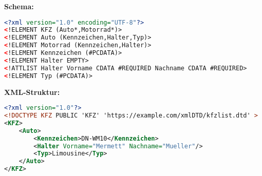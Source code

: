 \textbf{Schema:}
\begin{lstlisting}[language=xml, caption={XML-Datei},
label={lst:xml}]
<?xml version="1.0" encoding="UTF-8"?>
<!ELEMENT KFZ (Auto*,Motorrad*)>
<!ELEMENT Auto (Kennzeichen,Halter,Typ)>
<!ELEMENT Motorrad (Kennzeichen,Halter)>
<!ELEMENT Kennzeichen (#PCDATA)>
<!ELEMENT Halter EMPTY>
<!ATTLIST Halter Vorname CDATA #REQUIRED Nachname CDATA #REQUIRED>
<!ELEMENT Typ (#PCDATA)>
\end{lstlisting}

\textbf{XML-Struktur:}
\begin{lstlisting}[language=xml, caption={XML-Datei},
label={lst:xml}]
<?xml version="1.0"?>
<!DOCTYPE KFZ PUBLIC 'KFZ' 'https://example.com/xmlDTD/kfzlist.dtd' >
<KFZ>
	<Auto>
		<Kennzeichen>DN-WM10</Kennzeichen>
		<Halter Vorname="Mermett" Nachname="Mueller"/>
		<Typ>Limousine</Typ>
	</Auto>
</KFZ>
\end{lstlisting}

\clearpage 